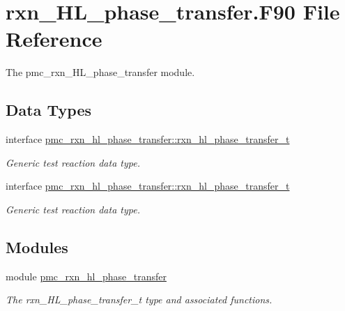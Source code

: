 \hypertarget{rxn___h_l__phase__transfer_8_f90}{}\section{rxn\+\_\+\+H\+L\+\_\+phase\+\_\+transfer.\+F90 File Reference}
\label{rxn___h_l__phase__transfer_8_f90}


The pmc\+\_\+rxn\+\_\+\+H\+L\+\_\+phase\+\_\+transfer module.  


\subsection*{Data Types}
\begin{DoxyCompactItemize}
\item 
interface \mbox{\hyperlink{structpmc__rxn__hl__phase__transfer_1_1rxn__hl__phase__transfer__t}{pmc\+\_\+rxn\+\_\+hl\+\_\+phase\+\_\+transfer\+::rxn\+\_\+hl\+\_\+phase\+\_\+transfer\+\_\+t}}
\begin{DoxyCompactList}\small\item\em Generic test reaction data type. \end{DoxyCompactList}\item 
interface \mbox{\hyperlink{structpmc__rxn__hl__phase__transfer_1_1rxn__hl__phase__transfer__t}{pmc\+\_\+rxn\+\_\+hl\+\_\+phase\+\_\+transfer\+::rxn\+\_\+hl\+\_\+phase\+\_\+transfer\+\_\+t}}
\begin{DoxyCompactList}\small\item\em Generic test reaction data type. \end{DoxyCompactList}\end{DoxyCompactItemize}
\subsection*{Modules}
\begin{DoxyCompactItemize}
\item 
module \mbox{\hyperlink{namespacepmc__rxn__hl__phase__transfer}{pmc\+\_\+rxn\+\_\+hl\+\_\+phase\+\_\+transfer}}
\begin{DoxyCompactList}\small\item\em The rxn\+\_\+\+H\+L\+\_\+phase\+\_\+transfer\+\_\+t type and associated functions. \end{DoxyCompactList}\end{DoxyCompactItemize}
